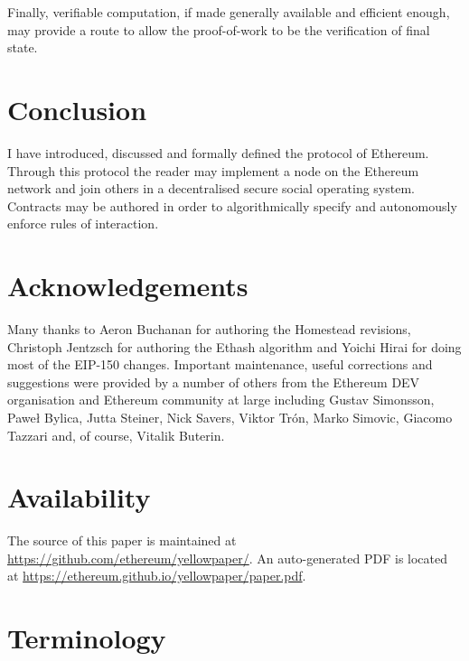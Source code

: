 \documentclass[9pt,oneside]{amsart}
\begin{document}
\begin{multicols}{2}
Finally, verifiable computation, if made generally available and efficient enough, may provide a route to allow the proof-of-work to be the verification of final state.

\section{Conclusion} \label{ch:conclusion}

I have introduced, discussed and formally defined the protocol of Ethereum. Through this protocol the reader may implement a node on the Ethereum network and join others in a decentralised secure social operating system. Contracts may be authored in order to algorithmically specify and autonomously enforce rules of interaction.

\section{Acknowledgements}

Many thanks to Aeron Buchanan for authoring the Homestead revisions, Christoph Jentzsch for authoring the Ethash algorithm and Yoichi Hirai for doing most of the EIP-150 changes. Important maintenance, useful corrections and suggestions were provided by a number of others from the Ethereum DEV organisation and Ethereum community at large including Gustav Simonsson, Pawe\l{} Bylica, Jutta Steiner, Nick Savers, Viktor Tr\'{o}n, Marko Simovic, Giacomo Tazzari and, of course, Vitalik Buterin.

\section{Availability}

The source of this paper is maintained at \url{https://github.com/ethereum/yellowpaper/}. An auto-generated PDF is located at \url{https://ethereum.github.io/yellowpaper/paper.pdf}.




\end{multicols}

\appendix

\section{Terminology} \label{ch:Terminology}
\end{document}

